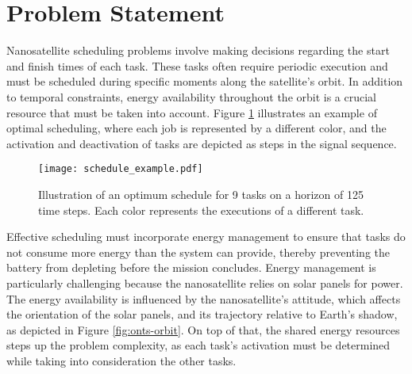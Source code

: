 % 


\section{Problem Statement}\label{sec:onts-problem-statement}

Nanosatellite scheduling problems involve making decisions regarding the start and finish times of each task.
These tasks often require periodic execution and must be scheduled during specific moments along the satellite's orbit.
In addition to temporal constraints, energy availability throughout the orbit is a crucial resource that must be taken into account.
Figure \ref{fig:example-scheduling} illustrates an example of optimal scheduling, where each job is represented by a different color, and the activation and deactivation of tasks are depicted as steps in the signal sequence.

\begin{figure}[h]
    \centering
    \texttt{[image: schedule\_example.pdf]}
    \caption{Illustration of an optimum schedule for 9 tasks on a horizon of 125 time steps. Each color represents the executions of a different task.}
    \label{fig:example-scheduling}
\end{figure}

Effective scheduling must incorporate energy management to ensure that tasks do not consume more energy than the system can provide, thereby preventing the battery from depleting before the mission concludes.
Energy management is particularly challenging because the nanosatellite relies on solar panels for power.
The energy availability is influenced by the nanosatellite's attitude, which affects the orientation of the solar panels, and its trajectory relative to Earth's shadow, as depicted in Figure \ref{fig:onts-orbit}.
On top of that, the shared energy resources steps up the problem complexity, as each task's activation must be determined while taking into consideration the other tasks.

